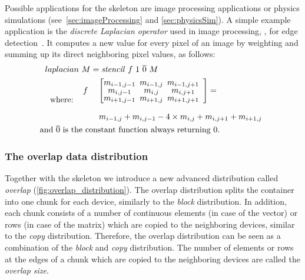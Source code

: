Possible applications for the \stencil skeleton are image processing applications or physics simulations (see~\autoref{sec:imageProcessing} and \autoref{sec:physicsSim}).
A simple example application is the \emph{discrete Laplacian operator} used in image processing, \eg, for edge detection~\cite{Umbaugh1997}.
It computes a new value for every pixel of an image by weighting and summing up its direct neighboring pixel values, as follows:
\begin{align*}
  laplacian&\ M = \stencil\ f\ 1\ \overline{0}\ M\\
  \text{where:} \ \ &
  \begin{array}{ll}%
  f&\ \left[\begin{array}{ccc}%
      \hspace{-.5em} m_{i-1,j-1}& \hspace{-.5em} m_{i-1,j} & \hspace{-.5em}m_{i-1,j+1}\vspace{-.25em}\\%
      \hspace{-.5em} m_{i,j-1}  & \hspace{-.5em} m_{i,j}   & \hspace{-.5em}m_{i,j+1}  \vspace{-.25em}\\%
      \hspace{-.5em} m_{i+1,j-1}& \hspace{-.5em} m_{i+1,j} & \hspace{-.5em}m_{i+1,j+1}
    \end{array}\right] = \\[2em]
          &\ m_{i-1,j} + m_{i,j-1} - 4 \times m_{i,j} + m_{i,j+1} + m_{i+1,j}
  \end{array} \\
  \text{and } \overline{0} \text{ is th}&\text{e constant function always returning $0$.}
\end{align*}

\subsubsection{The overlap data distribution}
\label{section:overlap}

Together with the \stencil skeleton we introduce a new advanced distribution called \emph{overlap} (\autoref{fig:overlap_distribution}).
The overlap distribution splits the container into one chunk for each device, similarly to the \emph{block} distribution.
In addition, each chunk consists of a number of continuous elements (in case of the vector) or rows (in case of the matrix) which are copied to the neighboring devices, similar to the \emph{copy} distribution.
Therefore, the overlap distribution can be seen as a combination of the \emph{block} and \emph{copy} distribution.
The number of elements or rows at the edges of a chunk which are copied to the neighboring devices are called the \emph{overlap size}.

